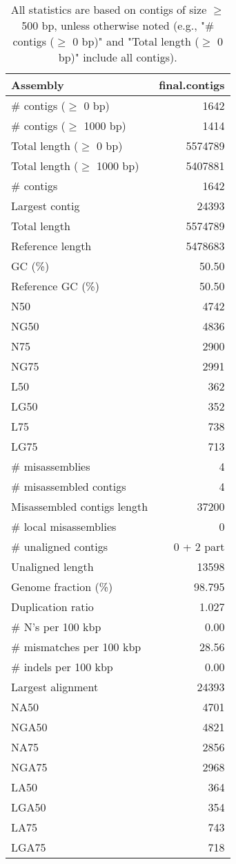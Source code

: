\documentclass[12pt,a4paper]{article}
\begin{document}
\begin{table}[ht]
\begin{center}
\caption{All statistics are based on contigs of size $\geq$ 500 bp, unless otherwise noted (e.g., "\# contigs ($\geq$ 0 bp)" and "Total length ($\geq$ 0 bp)" include all contigs).}
\begin{tabular}{|l*{1}{|r}|}
\hline
Assembly & final.contigs \\ \hline
\# contigs ($\geq$ 0 bp) & 1642 \\ \hline
\# contigs ($\geq$ 1000 bp) & 1414 \\ \hline
Total length ($\geq$ 0 bp) & 5574789 \\ \hline
Total length ($\geq$ 1000 bp) & 5407881 \\ \hline
\# contigs & 1642 \\ \hline
Largest contig & 24393 \\ \hline
Total length & 5574789 \\ \hline
Reference length & 5478683 \\ \hline
GC (\%) & 50.50 \\ \hline
Reference GC (\%) & 50.50 \\ \hline
N50 & 4742 \\ \hline
NG50 & 4836 \\ \hline
N75 & 2900 \\ \hline
NG75 & 2991 \\ \hline
L50 & 362 \\ \hline
LG50 & 352 \\ \hline
L75 & 738 \\ \hline
LG75 & 713 \\ \hline
\# misassemblies & 4 \\ \hline
\# misassembled contigs & 4 \\ \hline
Misassembled contigs length & 37200 \\ \hline
\# local misassemblies & 0 \\ \hline
\# unaligned contigs & 0 + 2 part \\ \hline
Unaligned length & 13598 \\ \hline
Genome fraction (\%) & 98.795 \\ \hline
Duplication ratio & 1.027 \\ \hline
\# N's per 100 kbp & 0.00 \\ \hline
\# mismatches per 100 kbp & 28.56 \\ \hline
\# indels per 100 kbp & 0.00 \\ \hline
Largest alignment & 24393 \\ \hline
NA50 & 4701 \\ \hline
NGA50 & 4821 \\ \hline
NA75 & 2856 \\ \hline
NGA75 & 2968 \\ \hline
LA50 & 364 \\ \hline
LGA50 & 354 \\ \hline
LA75 & 743 \\ \hline
LGA75 & 718 \\ \hline
\end{tabular}
\end{center}
\end{table}
\end{document}
